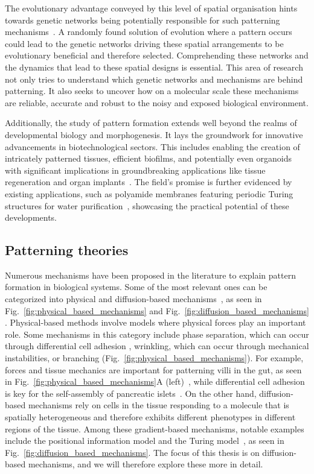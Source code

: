 The evolutionary advantage conveyed by this level of spatial organisation hints towards genetic networks being potentially responsible for such patterning mechanisms~\parencite{caro2005adaptive}.
A randomly found solution of evolution where a pattern occurs could lead to the genetic networks driving these spatial arrangements to be evolutionary beneficial and therefore selected. %
Comprehending these networks and the dynamics that lead to these spatial designs is essential.
This area of research not only tries to understand which genetic networks and mechanisms are behind patterning.
It also seeks to uncover how on a molecular scale these mechanisms are reliable, accurate and robust to the noisy and exposed biological environment.

Additionally, the study of pattern formation extends well beyond the realms of developmental biology and morphogenesis.
It lays the groundwork for innovative advancements in biotechnological sectors.
This includes enabling the creation of intricately patterned tissues, efficient biofilms, and potentially even organoids with significant implications in groundbreaking applications like tissue regeneration and organ implants~\parencite{Scholes2017}.
The field's promise is further evidenced by existing applications, such as polyamide membranes featuring periodic Turing structures for water purification~\parencite{Tan2018}, showcasing the practical potential of these developments.

\subsection{Patterning theories}
Numerous mechanisms have been proposed in the literature to explain pattern formation in biological systems.
Some of the most relevant ones can be categorized into physical and diffusion-based mechanisms~\parencite{hiscock2015mathematically, Scholes2017}, as seen in Fig.~\ref{fig:physical_based_mechanisms} and Fig.~\ref{fig:diffusion_based_mechanisms} .
Physical-based methods involve models where physical forces play an important role.
Some mechanisms in this category include phase separation, which can occur through differential cell adhesion , wrinkling, which can occur through mechanical instabilities, or branching (Fig.~\ref{fig:physical_based_mechanisms}).
For example, forces and tissue mechanics are important for patterning villi in the gut, as seen in Fig.~\ref{fig:physical_based_mechanisms}A (left)~\parencite{shyer2013villification}, while differential cell adhesion is key for the self-assembly of pancreatic islets~\parencite{jia2007tissue}.
On the other hand, diffusion-based mechanisms rely on cells in the tissue responding to a molecule that is spatially heterogeneous and therefore exhibits different phenotypes in different regions of the tissue.
Among these gradient-based mechanisms, notable examples include the positional information model and the Turing model~\parencite{Wolpert1969, Turing1952}, as seen in Fig.~\ref{fig:diffusion_based_mechanisms}.
The focus of this thesis is on diffusion-based mechanisms, and we will therefore explore these more in detail.

